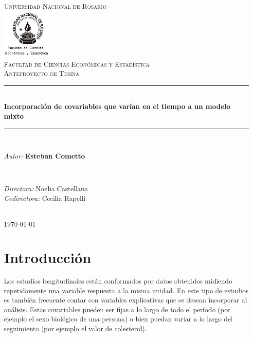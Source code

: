 \documentclass[12pt]{article}
\title{\thesistitle}
\author{\thesisauthorfirst\space\thesisauthorsecond}
\date{\thesisdate}
\def\thesistitle{Incorporación de covariables que varían en el tiempo a un modelo mixto}
\def\thesisauthorfirst{\textbf{Esteban Cometto}}
\def\thesissupervisorfirst{Noelia Castellana}
\def\thesissupervisorsecond{Cecilia Rapelli}
\def\thesisdate{\today}
\begin{document}
\begin{titlepage}
    \newcommand{\HRule}{\rule{\linewidth}{0.5mm}}
	\center
	\textsc{\Large Universidad Nacional de Rosario}\\[.7cm]
	\includegraphics[width=25mm]{img/fceye-unr.png}\\[.5cm]
	\textsc{Facultad de Ciencias Económicas y Estadística}\\[0.5cm]
	\textsc{Anteproyecto de Tesina}
	
	\HRule \\[0.4cm]
	{ \huge \bfseries \thesistitle}\\[0.1cm]
	\HRule \\[.5cm]
	
	\begin{minipage}{0.6\textwidth}
	\large
	\emph{Autor:}	\thesisauthorfirst
	\end{minipage}
	\\[.6cm]
	\begin{minipage}{0.6\textwidth}
	\emph{Directora:} 	\thesissupervisorfirst \\[.2cm]
	\emph{Codirectora:} 	\thesissupervisorsecond
	\end{minipage}
	\\[4cm]
	\vfill
	{\large \thesisdate}\\
	\clearpage
\end{titlepage}

\newpage
\tableofcontents

\newpage
\section{Introducción}

Los estudios longitudinales están conformados por datos obtenidos midiendo repetidamente una variable respuesta a
la misma unidad. En este tipo de estudios es también frecuente contar con variables explicativas que se desean incorporar
al análisis. Estas covariables pueden ser fijas a lo largo de todo el período (por ejemplo el sexo biológico de una persona)
o bien puedan variar a lo largo del seguimiento (por ejemplo el valor de colesterol).
\end{document}
